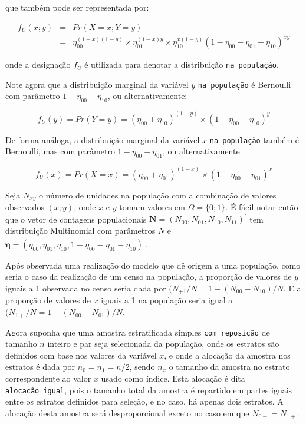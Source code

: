 \documentclass[]{book}
\theoremstyle{definition}
\theoremstyle{definition}
\theoremstyle{definition}
\theoremstyle{remark}
\begin{document}
que também pode ser representada por:

\begin{eqnarray}
 f_U (x ; y) &=& Pr( X = x ; Y = y )\\
             & =& \eta_{00}^{(1-x)(1-y)} \times \eta_{01}^{(1-x)y} \times \eta_{10}^{x(1-y)} (1 - \eta_{00} - \eta_{01} - \eta_{10})^{xy} \nonumber
\end{eqnarray}

onde a designação \(f_U\) é utilizada para denotar a distribuição
\texttt{na\ população}.

Note agora que a distribuição marginal da variável \(y\)
\texttt{na\ população} é Bernoulli com parâmetro
\(1 - \eta_{00} - \eta_{10}\), ou alternativamente:

\begin{equation}
 f_U (y) = Pr( Y = y ) = (\eta_{00} + \eta_{10})^{(1-y)} \times (1 - \eta_{00} - \eta_{10})^y
\end{equation}

De forma análoga, a distribuição marginal da variável \(x\)
\texttt{na\ população} também é Bernoulli, mas com parâmetro
\(1 - \eta_{00} - \eta_{01}\), ou alternativamente:

\begin{equation}
 f_U (x) = Pr( X = x ) = (\eta_{00} + \eta_{01})^{(1-x)} \times (1 - \eta_{00} - \eta_{01})^x
\end{equation}

Seja \(N_{xy}\) o número de unidades na população com a combinação de
valores observados \((x;y)\), onde \(x\) e \(y\) tomam valores em
\(\Omega = \{ 0 ; 1 \}\). É fácil notar então que o vetor de contagens
populacionais
\(\mathbf{N} = ( N_{00}, N_{01}, N_{10}, N_{11} )^{\prime}\) tem
distribuição Multinomial com parâmetros \(N\) e
\(\mathbf{\eta} = (\eta_{00} , \eta_{01} , \eta_{10} , 1 - \eta_{00} - \eta_{01} - \eta_{10} )^{\prime}\).

Após observada uma realização do modelo que dê origem a uma população,
como seria o caso da realização de um censo na população, a proporção de
valores de \(y\) iguais a 1 observada no censo seria dada por
\((N_{+1} / N = 1 - (N_{00} - N_{10})/N\). E a proporção de valores de
\(x\) iguais a 1 na população seria igual a
\((N_{1+} / N = 1 - (N_{00} - N_{01})/N\).

Agora suponha que uma amostra estratificada simples
\texttt{com\ reposição} de tamanho \(n\) inteiro e par seja selecionada
da população, onde os estratos são definidos com base nos valores da
variável \(x\), e onde a alocação da amostra nos estratos é dada por
\(n_0 = n_1 = n/2\), sendo \(n_x\) o tamanho da amostra no estrato
correspondente ao valor \(x\) usado como índice. Esta alocação é dita
\texttt{alocação\ igual}, pois o tamanho total da amostra é repartido em
partes iguais entre os estratos definidos para seleção, e no caso, há
apenas dois estratos. A alocação desta amostra será desproporcional
exceto no caso em que \(N_{0+} = N_{1+}\).
\end{document}

